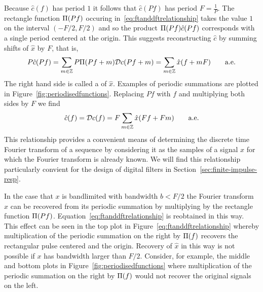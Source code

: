 Because $\hat{c}(f)$ has period $1$ it follows that $\hat{c}(Pf)$ has period $F = \tfrac{1}{P}$.  The rectangle function $\Pi(Pf)$ occuring in~\eqref{eq:ftanddftrelationship} takes the value $1$ on the interval $(-F/2, F/2)$ and so the product $\Pi(Pf)\hat{c}(Pf)$ corresponds with a single period centered at the origin.  This suggests reconstructing $\hat{c}$ by summing shifts of $\hat{x}$ by $F$, that is,
\[
P \hat{c}(Pf) = \sum_{m \in {\mathbb Z}} P \Pi(Pf + m) {\mathcal D} c(Pf + m) = \sum_{m \in {\mathbb Z}} \hat{x}(f + mF) \qquad \text{a.e.}
\]
The right hand side is called a  of $\hat{x}$.  Examples of periodic summations are plotted in Figure~\ref{fig:periodisedfunctions}.  Replacing $Pf$ with $f$ and multiplying both sides by $F$ we find
\begin{equation}\label{eq:dftsignalperiodicsumP}
\hat{c}(f) = {\mathcal D} c(f) = F \sum_{m \in {\mathbb Z}} \hat{x}(Ff + Fm) \qquad \text{a.e.}
\end{equation}
This relationship provides a convenient means of determining the discrete time Fourier transform of a sequence by considering it as the samples of a signal $x$ for which the Fourier transform is already known.  We will find this relationship particularly convient for the design of digital filters in Section~\ref{sec:finite-impulse-resp}. 

In the case that $x$ is bandlimited with bandwidth $b < F/2$ the Fourier transform $\hat{x}$ can be recovered from its periodic summation by multiplying by the rectangle function $\Pi(Pf)$. Equation~\eqref{eq:ftanddftrelationship} is reobtained in this way.  This effect can be seen in the top plot in Figure~\ref{eq:ftanddftrelationship} whereby multiplication of the periodic summation on the right by $\Pi(f)$ recovers the rectangular pulse centered and the origin.  Recovery of $\hat{x}$ in this way is not possible if $x$ has bandwidth larger than $F/2$.  Consider, for example, the middle and bottom plots in Figure~\ref{fig:periodisedfunctions} where multiplication of the periodic summation on the right by $\Pi(f)$ would not recover the original signals on the left.  

